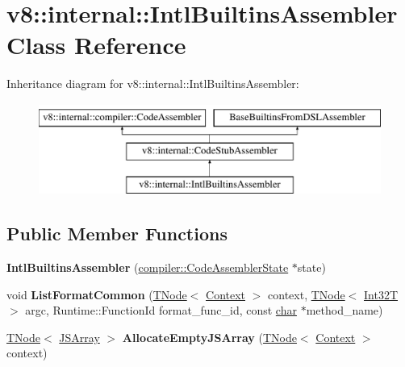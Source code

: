\hypertarget{classv8_1_1internal_1_1IntlBuiltinsAssembler}{}\section{v8\+:\+:internal\+:\+:Intl\+Builtins\+Assembler Class Reference}
\label{classv8_1_1internal_1_1IntlBuiltinsAssembler}
Inheritance diagram for v8\+:\+:internal\+:\+:Intl\+Builtins\+Assembler\+:\begin{figure}[H]
\begin{center}
\leavevmode
\includegraphics[height=3.000000cm]{classv8_1_1internal_1_1IntlBuiltinsAssembler}
\end{center}
\end{figure}
\subsection*{Public Member Functions}
\begin{DoxyCompactItemize}
\item 
\mbox{\label{classv8_1_1internal_1_1IntlBuiltinsAssembler_abecf674abdf3753ffb4a08c631cd53f1}} 
{\bfseries Intl\+Builtins\+Assembler} (\mbox{\hyperlink{classv8_1_1internal_1_1compiler_1_1CodeAssemblerState}{compiler\+::\+Code\+Assembler\+State}} $\ast$state)
\item 
\mbox{\label{classv8_1_1internal_1_1IntlBuiltinsAssembler_aa9df4f2c3d268dcc4d3ad823dc5d18b7}} 
void {\bfseries List\+Format\+Common} (\mbox{\hyperlink{classv8_1_1internal_1_1compiler_1_1TNode}{T\+Node}}$<$ \mbox{\hyperlink{classv8_1_1internal_1_1Context}{Context}} $>$ context, \mbox{\hyperlink{classv8_1_1internal_1_1compiler_1_1TNode}{T\+Node}}$<$ \mbox{\hyperlink{structv8_1_1internal_1_1Int32T}{Int32T}} $>$ argc, Runtime\+::\+Function\+Id format\+\_\+func\+\_\+id, const \mbox{\hyperlink{classchar}{char}} $\ast$method\+\_\+name)
\item 
\mbox{\label{classv8_1_1internal_1_1IntlBuiltinsAssembler_afc7d9a1c6f6dc5dddf36f278dd0a2e75}} 
\mbox{\hyperlink{classv8_1_1internal_1_1compiler_1_1TNode}{T\+Node}}$<$ \mbox{\hyperlink{classv8_1_1internal_1_1JSArray}{J\+S\+Array}} $>$ {\bfseries Allocate\+Empty\+J\+S\+Array} (\mbox{\hyperlink{classv8_1_1internal_1_1compiler_1_1TNode}{T\+Node}}$<$ \mbox{\hyperlink{classv8_1_1internal_1_1Context}{Context}} $>$ context)
\end{DoxyCompactItemize}
